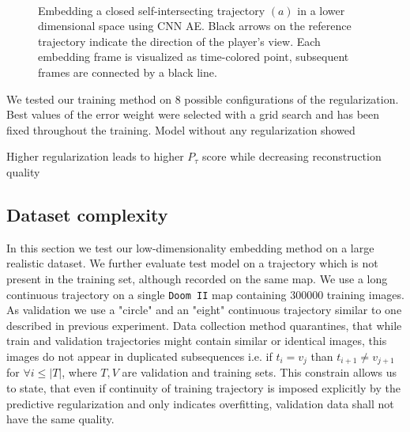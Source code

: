 \begin{figure}[t!]
	\centering
	\\
    	\caption{Embedding a closed self-intersecting trajectory $(a)$ in a lower dimensional space using CNN AE. Black arrows on the reference trajectory indicate the direction of the player's view. Each embedding frame is visualized as time-colored point, subsequent frames are connected by a black line.}
    	\label{fig:model_param}
\end{figure}


We tested our training method on 8 possible configurations of the regularization. Best values of the error weight were selected with a grid search and has been fixed throughout the training. Model without any regularization showed

Higher regularization leads to higher $P_{\tau}$ score while decreasing reconstruction quality


\subsection{Dataset complexity}

In this section we test our low-dimensionality embedding method on a large realistic dataset. We further evaluate test model on a trajectory which is not present in the training set, although recorded on the same map. We use a long continuous trajectory on a single \texttt{Doom II} map containing 300000 training images.
As validation we use a "circle" and an "eight" continuous trajectory similar to one described in previous experiment.
Data collection method quarantines, that while train and validation trajectories might contain similar or identical images, this images do not appear in duplicated subsequences i.e. if $t_i = v_j$ than $t_{i+1} \neq v_{j+1}$ for $\forall i \leq |T|$, where $T, V$ are validation and training sets. This constrain allows us to state, that even if continuity of training trajectory is imposed explicitly by the predictive regularization and only indicates overfitting, validation data shall not have the same quality.

